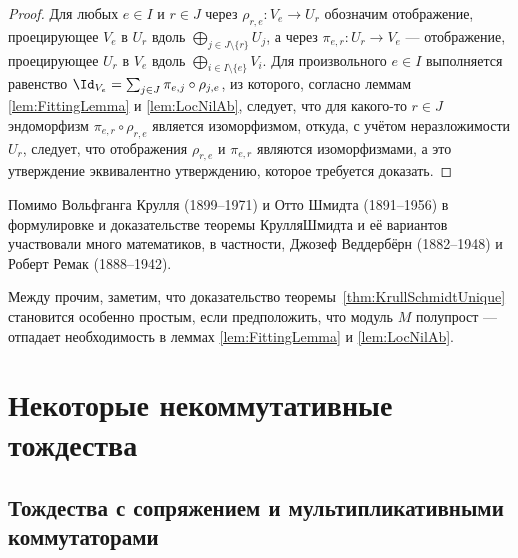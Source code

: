 \documentclass[
	extrafontsizes,
	11pt,
	hyphens,
]{memoir}
\begin{document}
\begin{proof}
Для любых \(e \in I\) и \(r \in J\) через \(\rho_{r,e} : V_e \to U_r\) обозначим отображение, проецирующее \(V_e\) в \(U_r\) вдоль \(\bigoplus_{j \in J \setminus \{r\}} U_j\), а через \(\pi_{e,r} : U_r \to V_e\) --- отображение, проецирующее \(U_r\) в \(V_e\) вдоль \(\bigoplus_{i \in I \setminus \{e\}} V_i\).
Для произвольного \(e \in I\)
выполняется равенство \(\Id_{V_e} = \sum_{j \in J} \pi_{e,j} \circ \rho_{j,e}\), из которого,
согласно леммам \ref{lem:FittingLemma} и \ref{lem:LocNilAb},
следует, что для какого-то \(r \in J\) эндоморфизм \(\pi_{e,r} \circ \rho_{r,e}\) является изоморфизмом, откуда, с учётом неразложимости \(U_r\), следует, что отображения \(\rho_{r,e}\) и \(\pi_{e,r}\) являются изоморфизмами, а это утверждение эквивалентно утверждению, которое требуется доказать.
\end{proof}

\begin{remark}
Помимо Вольфганга Крулля (1899--1971) и Отто Шмидта (1891--1956) в формулировке и доказательстве теоремы Крулля\namedash{}Шмидта и её вариантов участвовали много математиков, в частности, Джозеф Веддербёрн (1882--1948) и Роберт Ремак (1888--1942).
\end{remark}

\begin{remark}
Между прочим, заметим, что доказательство теоремы~\ref{thm:KrullSchmidtUnique} становится особенно простым, если предположить, что модуль \(M\) полупрост --- отпадает необходимость в леммах \ref{lem:FittingLemma} и \ref{lem:LocNilAb}.
\end{remark}



\chapter{Некоторые некоммутативные тождества}


\section[Тождества с сопряжением и мультипликативными коммутаторами][Тождества с сопряжением и мульт.\ коммутаторами]{Тождества с сопряжением и мультипликативными коммутаторами}
\end{document}
